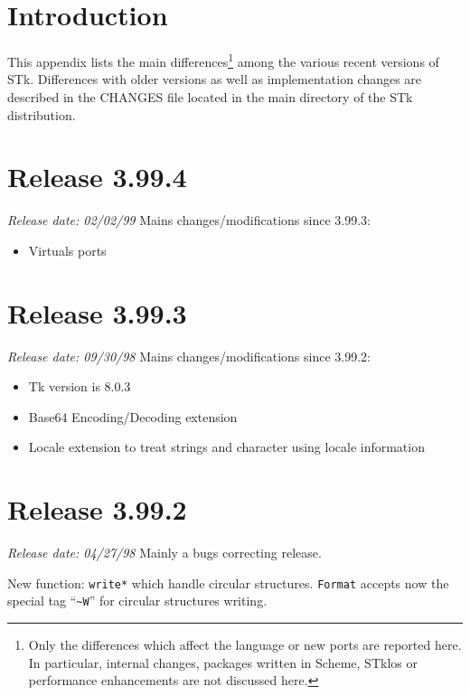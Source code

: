 %
%
%

\section*{Introduction}

This appendix lists the main differences\footnote{ Only the
  differences which affect the language or new ports are reported
  here.  In particular, internal changes, packages written in Scheme,
  STklos or performance enhancements are not discussed here.} among
the various recent versions of STk.  Differences with older versions
as well as implementation changes are described in the CHANGES file
located in the main directory of the STk distribution.

\section*{Release 3.99.4}
\small{\emph{Release date: 02/02/99}}
Mains changes/modifications since 3.99.3:
\begin{itemize}
\item  Virtuals ports
\end{itemize}

\section*{Release 3.99.3}
\small{\emph{Release date: 09/30/98}}
Mains changes/modifications since 3.99.2:
\begin{itemize}
\item  Tk version is 8.0.3
  
\item Base64 Encoding/Decoding extension
  
\item Locale extension to treat strings and character using locale
  information
\end{itemize}

\section*{Release 3.99.2}
\small{\emph{Release date: 04/27/98}}
Mainly a bugs correcting release.

New function: \texttt{write*} which handle circular structures. \texttt{Format}
accepts now the special tag ``\verb+~W+'' for circular structures writing.

